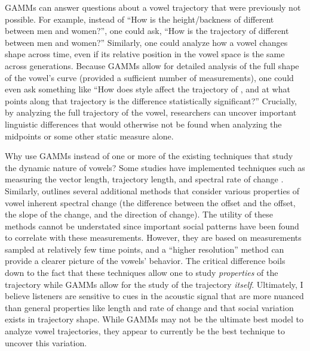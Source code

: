 GAMMs can answer questions about a vowel trajectory that were previously not possible. For example, instead of ``How is the height/backness of \trap different between men and women?'', one could ask, ``How is the trajectory of \trap different between men and women?'' Similarly, one could analyze how a vowel changes shape across time, even if its relative position in the vowel space is the same across generations. Because GAMMs allow for detailed analysis of the full shape of the vowel’s curve (provided a sufficient number of measurements), one could even ask something like ``How does style affect the trajectory of \goose, and at what points along that trajectory is the difference statistically significant?'' Crucially, by analyzing the full trajectory of the vowel, researchers can uncover important linguistic differences that would otherwise not be found when analyzing the midpoints or some other static measure alone.

Why use GAMMs instead of one or more of the existing techniques that study the dynamic nature of vowels? Some studies have implemented techniques such as measuring the vector length, trajectory length, and spectral rate of change \citep{fox_jacewicz_2009, farrington_etal_2018, stanley_renwick_2019_LSA_poster}. Similarly, \citet{morrison_2013} outlines several additional methods that consider various properties of vowel inherent spectral change (the difference between the offset and the offset, the slope of the change, and the direction of change). The utility of these methods cannot be understated since important social patterns have been found to correlate with these measurements. However, they are based on measurements sampled at relatively few time points, and a ``higher resolution'' method can provide a clearer picture of the vowels' behavior. The critical difference boils down to the fact that these techniques allow one to study \textit{properties} of the trajectory while GAMMs allow for the study of the trajectory \textit{itself}. Ultimately, I believe listeners are sensitive to cues in the acoustic signal that are more nuanced than general properties like length and rate of change and that social variation exists in trajectory shape. While GAMMs may not be the ultimate best model to analyze vowel trajectories, they appear to currently be the best technique to uncover this variation.


